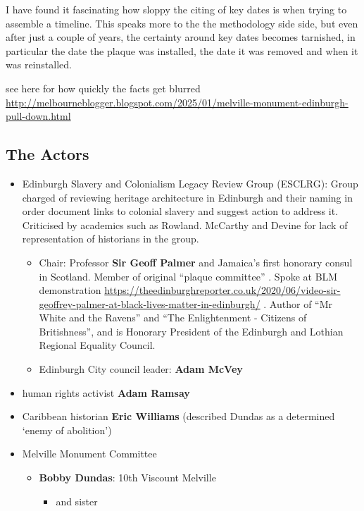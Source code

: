 \documentclass{scrartcl}
\begin{document}
I have found it fascinating how sloppy the citing of key dates is when trying to assemble a timeline. This speaks more to the the methodology side side, but even after just a couple of years, the certainty around  key dates becomes tarnished, in particular the date the plaque was installed, the date it was removed and when it was reinstalled.

see here for how quickly the facts get blurred \url{http://melbourneblogger.blogspot.com/2025/01/melville-monument-edinburgh-pull-down.html}

\subsection{The Actors}\label{actors}

\begin{itemize}
    \item Edinburgh Slavery and Colonialism Legacy Review Group (ESCLRG): Group charged of reviewing heritage architecture in Edinburgh and their naming in order document links to colonial slavery and suggest action to address it. Criticised by academics such as Rowland. McCarthy and Devine for lack of representation of historians in the group.
    \begin{itemize}
        \item Chair: Professor \textbf{Sir Geoff Palmer} and Jamaica’s first honorary consul in Scotland. Member of original  ``plaque committee'' \cite{hay_2020_2}. Spoke at BLM demonstration \url{https://theedinburghreporter.co.uk/2020/06/video-sir-geoffrey-palmer-at-black-lives-matter-in-edinburgh/} . Author of ``Mr White and the Ravens'' and ``The Enlightenment - Citizens of Britishness'', and is Honorary President of the Edinburgh and Lothian Regional Equality Council.
    \item Edinburgh City council leader: \textbf{Adam McVey}
    \end{itemize}
    \item human rights activist \textbf{Adam Ramsay}
    \item Caribbean historian\textbf{ Eric Williams} (described Dundas as a determined ‘enemy of abolition’) \cite{mullen_2021}
    \item  Melville Monument Committee
    \begin{itemize}
        \item \textbf{Bobby Dundas}: 10th Viscount Melville
        \begin{itemize}
            \item and sister

\end{itemize}
\end{itemize}
\end{itemize}
\end{document}
